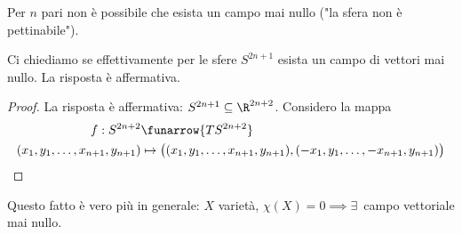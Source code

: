 \begin{cor}
 Per $n$ pari non è possibile che esista un campo mai nullo
 ("la sfera non è pettinabile").
\end{cor}
\begin{prop}
 Ci chiediamo se effettivamente per le sfere $S^{2n+1}$ esista un campo di vettori mai nullo. La risposta è affermativa.
\end{prop}
\begin{proof}
La risposta è affermativa: $S^{2n+1}\subseteq\R^{2n+2}$. Considero la mappa 
\begin{align*}
 f : S^{2n+2} &\funarrow {TS^{2n+2}} \\
 (x_1, y_1,\dots, x_{n+1}, y_{n+1}) &\mapsto \big((x_1, y_1,\dots, x_{n+1}, y_{n+1}), (-x_1, y_1,\dots, -x_{n+1}, y_{n+1})\big)
\end{align*}


\end{proof}
\begin{oss}
 Questo fatto è vero più in generale: $X$ varietà, $\chi(X)=0\implies \exists$~campo vettoriale mai nullo.
\end{oss}

